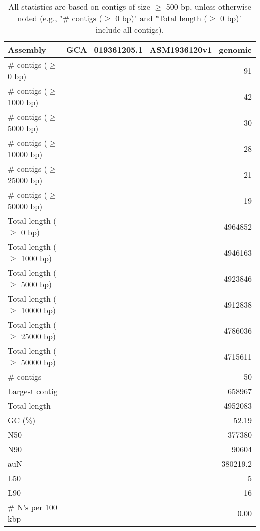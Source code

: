 \documentclass[12pt,a4paper]{article}
\begin{document}
\begin{table}[ht]
\begin{center}
\caption{All statistics are based on contigs of size $\geq$ 500 bp, unless otherwise noted (e.g., "\# contigs ($\geq$ 0 bp)" and "Total length ($\geq$ 0 bp)" include all contigs).}
\begin{tabular}{|l*{1}{|r}|}
\hline
Assembly & GCA\_019361205.1\_ASM1936120v1\_genomic \\ \hline
\# contigs ($\geq$ 0 bp) & 91 \\ \hline
\# contigs ($\geq$ 1000 bp) & 42 \\ \hline
\# contigs ($\geq$ 5000 bp) & 30 \\ \hline
\# contigs ($\geq$ 10000 bp) & 28 \\ \hline
\# contigs ($\geq$ 25000 bp) & 21 \\ \hline
\# contigs ($\geq$ 50000 bp) & 19 \\ \hline
Total length ($\geq$ 0 bp) & 4964852 \\ \hline
Total length ($\geq$ 1000 bp) & 4946163 \\ \hline
Total length ($\geq$ 5000 bp) & 4923846 \\ \hline
Total length ($\geq$ 10000 bp) & 4912838 \\ \hline
Total length ($\geq$ 25000 bp) & 4786036 \\ \hline
Total length ($\geq$ 50000 bp) & 4715611 \\ \hline
\# contigs & 50 \\ \hline
Largest contig & 658967 \\ \hline
Total length & 4952083 \\ \hline
GC (\%) & 52.19 \\ \hline
N50 & 377380 \\ \hline
N90 & 90604 \\ \hline
auN & 380219.2 \\ \hline
L50 & 5 \\ \hline
L90 & 16 \\ \hline
\# N's per 100 kbp & 0.00 \\ \hline
\end{tabular}
\end{center}
\end{table}
\end{document}
